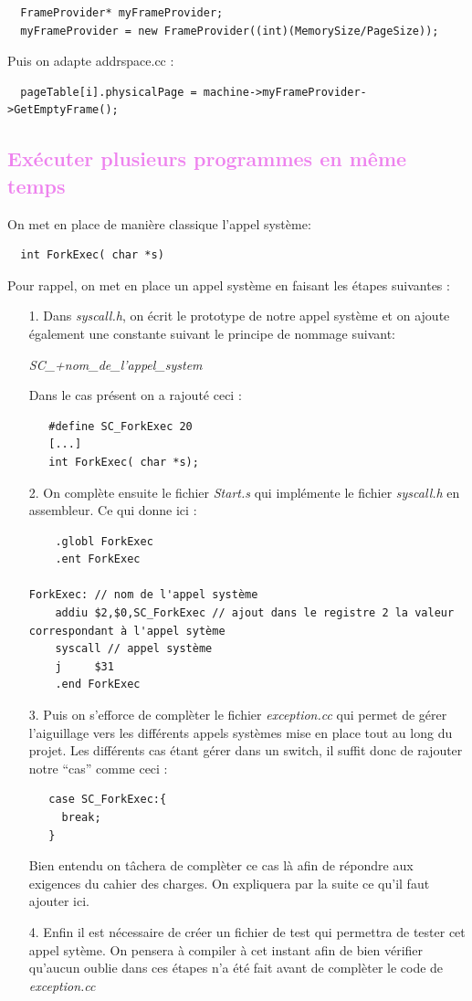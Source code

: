 \documentclass[a4paper,10pt]{article}
\begin{document}
  \begin{lstlisting}
  FrameProvider* myFrameProvider;
  myFrameProvider = new FrameProvider((int)(MemorySize/PageSize));
  \end{lstlisting}

  Puis on adapte addrspace.cc :

  \begin{lstlisting}
  pageTable[i].physicalPage = machine->myFrameProvider->GetEmptyFrame();
  \end{lstlisting}

  \textcolor{Violet}{\section{Exécuter plusieurs programmes en même temps}}
  On met en place de manière classique l'appel système: 
  \begin{lstlisting}
  int ForkExec( char *s)
  \end{lstlisting}
  Pour rappel, on met en place un appel système en faisant les étapes suivantes :
  \begin{itemize}
   \item[1.] Dans \emph{syscall.h}, on écrit le prototype de notre appel système et on ajoute également une constante suivant le principe de nommage suivant:
   \begin{center}
   \emph{SC\_+nom\_de\_l'appel\_system}
   \end{center}
  Dans le cas présent on a rajouté ceci : 
  \begin{lstlisting}
   #define SC_ForkExec 20
   [...]
   int ForkExec( char *s);
  \end{lstlisting}
  \item[2.] On complète ensuite le fichier \emph{Start.s} qui implémente le fichier \emph{syscall.h} en assembleur. Ce qui donne ici :
  \begin{lstlisting}
   	.globl ForkExec
	.ent ForkExec

ForkExec: // nom de l'appel système
	addiu $2,$0,SC_ForkExec // ajout dans le registre 2 la valeur correspondant à l'appel sytème
	syscall // appel système
	j     $31
	.end ForkExec
  \end{lstlisting}
  \item[3.] Puis on s'efforce de complèter le fichier \emph{exception.cc} qui permet de gérer l'aiguillage vers les différents appels systèmes mise en place 
  tout au long du projet. Les différents cas étant gérer dans un switch, il suffit donc de rajouter notre ``cas'' comme ceci :
  \begin{lstlisting}
   case SC_ForkExec:{
     break;
   }
  \end{lstlisting}
  Bien entendu on tâchera de complèter ce cas là afin de répondre aux exigences du cahier des charges. On expliquera par la suite ce qu'il faut ajouter ici.
  
  \item[4.] Enfin il est nécessaire de créer un fichier de test qui permettra de tester cet appel sytème. On pensera à compiler à cet instant afin de bien 
  vérifier qu'aucun oublie dans ces étapes n'a été fait avant de complèter le code de \emph{exception.cc}
  \end{itemize}  
\end{document}
